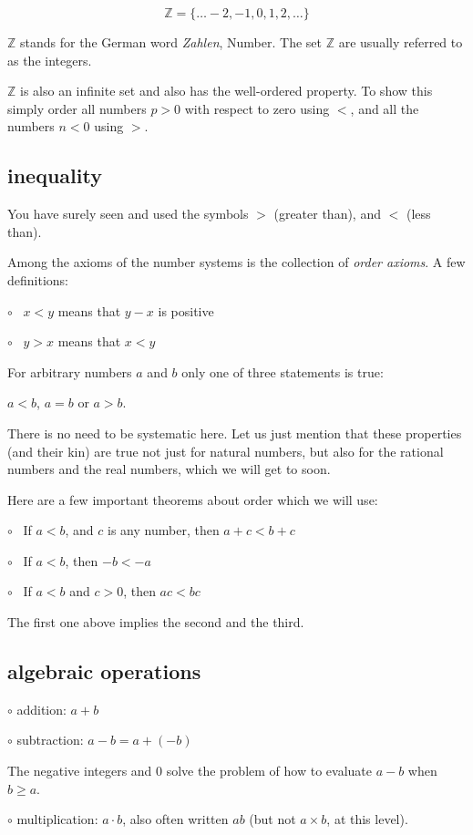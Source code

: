 \documentclass[11pt, oneside]{article}
\begin{document}
\[ \mathbb{Z} = \{ \dots -2, -1, 0, 1, 2, \dots \} \]

$\mathbb{Z}$ stands for the German word \emph{Zahlen}, Number.  The set $\mathbb{Z}$ are usually referred to as the integers.

$\mathbb{Z}$ is also an infinite set and also has the well-ordered property.  To show this simply order all numbers $p > 0$ with respect to zero using $<$, and all the numbers $n < 0$ using $>$.

\subsection*{inequality}
You have surely seen and used the symbols $>$ (greater than), and $<$ (less than).

Among the axioms of the number systems is the collection of \emph{order axioms}.  A few definitions:

$\circ$ \ $x < y$ means that $y - x$ is positive

$\circ$ \ $y > x$ means that $x < y$

For arbitrary numbers $a$ and $b$ only one of three statements is true:  

$a < b$, $a = b$ or $a > b$.

There is no need to be systematic here.  Let us just mention that these properties (and their kin) are true not just for natural numbers, but also for the rational numbers and the real numbers, which we will get to soon.  

Here are a few important theorems about order which we will use:

$\circ$ \ If $a < b$, and $c$ is any number, then $a + c < b + c$

$\circ$ \ If $a < b$, then $-b < -a$

$\circ$ \ If $a < b$ and $c > 0$, then $ac < bc$

The first one above implies the second and the third.

\subsection*{algebraic operations}

$\circ$ addition:  $a + b$

$\circ$ subtraction:  $a - b = a + (-b)$

The negative integers and $0$ solve the problem of how to evaluate $a - b$ when $b \ge a$.

$\circ$ multiplication:  $a \cdot b$, also often written $ab$ (but not $a \times b$, at this level).
\end{document}
